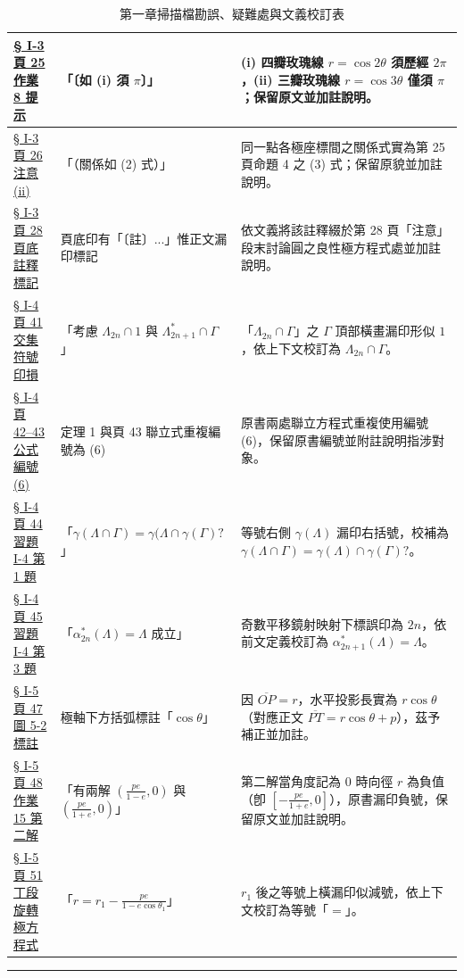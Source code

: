 \documentclass[a4paper,12pt,twoside]{article}
\begin{document}
\begin{table}[H]
\begin{tabularx}{\textwidth}{|p{3.2cm}|p{3.8cm}|X|}
\hyperref[note:b5-ch1-p25-hw8]{§ I-3 頁 25 作業 8 提示} & 
「〔如 (i) 須 $\pi$〕」 & 
(i) 四瓣玫瑰線 $r=\cos 2\theta$ 須歷經 $2\pi$，(ii) 三瓣玫瑰線 $r=\cos 3\theta$ 僅須 $\pi$；保留原文並加註說明。 \\ \hline

\hyperref[note:b5-ch1-p26-note]{§ I-3 頁 26 注意 (ii)} & 
「（關係如 (2) 式）」 & 
同一點各極座標間之關係式實為第 25 頁命題 4 之 (3) 式；保留原貌並加註說明。 \\ \hline

\hyperref[note:b5-ch1-p28-fn]{§ I-3 頁 28 頁底註釋標記} & 
頁底印有「〔註〕...」惟正文漏印標記 & 
依文義將該註釋綴於第 28 頁「注意」段末討論圓之良性極方程式處並加註說明。 \\ \hline

\hyperref[note:b5-ch1-p41-gamma]{§ I-4 頁 41 交集符號印損} & 
「考慮 $\Lambda_{2n} \cap 1$ 與 $\Lambda^*_{2n+1} \cap \Gamma$」 & 
「$\Lambda_{2n} \cap \Gamma$」之 $\Gamma$ 頂部橫畫漏印形似 $1$，依上下文校訂為 $\Lambda_{2n} \cap \Gamma$。 \\ \hline

\hyperref[note:b5-ch1-p43-eq6]{§ I-4 頁 42--43 公式編號 (6)} & 
定理 1 與頁 43 聯立式重複編號為 (6) & 
原書兩處聯立方程式重複使用編號 (6)，保留原書編號並附註說明指涉對象。 \\ \hline

\hyperref[note:b5-ch1-p44-paren]{§ I-4 頁 44 習題 I-4 第 1 題} & 
「$\gamma(\Lambda \cap \Gamma) = \gamma(\Lambda \cap \gamma(\Gamma)?$」 & 
等號右側 $\gamma(\Lambda)$ 漏印右括號，校補為 $\gamma(\Lambda \cap \Gamma) = \gamma(\Lambda) \cap \gamma(\Gamma)?$。 \\ \hline

\hyperref[note:b5-ch1-p45-alpha]{§ I-4 頁 45 習題 I-4 第 3 題} & 
「$\alpha^*_{2n}(\Lambda) = \Lambda$ 成立」 & 
奇數平移鏡射映射下標誤印為 $2n$，依前文定義校訂為 $\alpha^*_{2n+1}(\Lambda) = \Lambda$。 \\ \hline

\hyperref[note:b5-ch1-p47-fig52]{§ I-5 頁 47 圖 5-2 標註} & 
極軸下方括弧標註「$\cos\theta$」 & 
因 $\overline{OP}=r$，水平投影長實為 $r\cos\theta$（對應正文 $\overline{PT}=r\cos\theta+p$），茲予補正並加註。 \\ \hline

\hyperref[note:b5-ch1-p48-hw15]{§ I-5 頁 48 作業 15 第二解} & 
「有兩解 $(\frac{pe}{1-e}, 0)$ 與 $(\frac{pe}{1+e}, 0)$」 & 
第二解當角度記為 $0$ 時向徑 $r$ 為負值（卽 $[-\frac{pe}{1+e}, 0]$），原書漏印負號，保留原文並加註說明。 \\ \hline

\hyperref[note:b5-ch1-p51-eq]{§ I-5 頁 51 丁段旋轉極方程式} & 
「$r = r_1 - \frac{pe}{1 - e\cos\theta_1}$」 & 
$r_1$ 後之等號上橫漏印似減號，依上下文校訂為等號「$=$」。 \\ \hline

\end{tabularx}
\caption{第一章掃描檔勘誤、疑難處與文義校訂表}
\label{tab:errata_b5_ch1}
\end{table}

\vspace{1em}
\hrule
\vspace{1em}

\tableofcontents
\newpage


\end{document}
